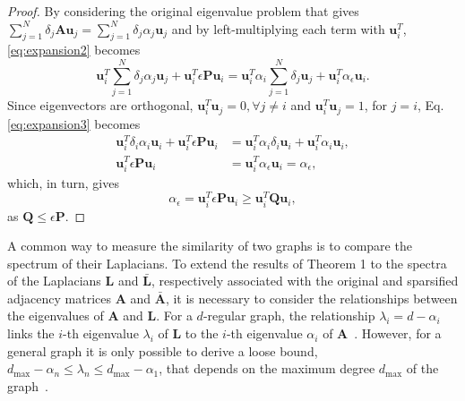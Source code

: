 \documentclass[journal]{IEEEtran}
\def\u{{\mathbf u}}
\def\A{{\mathbf A}}
\def\L{{\mathbf L}}
\begin{document}
\begin{proof}
By considering the original eigenvalue problem that gives $\sum \limits_{j=1}^N \delta_j \A \u_j = \sum \limits_{j=1}^N \delta_j \alpha_j \u_j$ and by left-multiplying each term with $\u_i^T$, \eqref{eq:expansion2} becomes
\begin{equation}
    \label{eq:expansion3}
    \u_i^T \sum \limits_{j=1}^N \delta_j \alpha_j \u_j + \u_i^T \epsilon \mathbf{P}\u_i =   \u_i^T \alpha_i \sum \limits_{j=1}^N \delta_j \u_j + \u_i^T \alpha_{\epsilon}\u_i.
\end{equation}
Since eigenvectors are orthogonal, $\u_i^T \u_j = 0, \forall j \neq i$ and $\u_i^T \u_j = 1$, for $j = i$, Eq. \eqref{eq:expansion3} becomes
\begin{equation}
    \begin{aligned}
    \u_i^T \delta_i \alpha_i \u_i + \u_i^T \epsilon \mathbf{P}\u_i & = \u_i^T \alpha_i \delta_i \u_i + \u_i^T \alpha_i\u_i, \\
    \u_i^T \epsilon \mathbf{P}\u_i & =  \u_i^T \alpha_{\epsilon}\u_i = \alpha_{\epsilon},
    \end{aligned}
\end{equation}
which, in turn, gives 
\begin{equation}
    \alpha_{\epsilon} = \u_i^T \epsilon \mathbf{P} \u_i \geq \u_i^T \mathbf{Q} \u_i,
\end{equation}
as $\mathbf{Q} \leq \epsilon \mathbf{P}$.
\end{proof}

A common way to measure the similarity of two graphs is to compare the spectrum of their Laplacians.
To extend the results of Theorem 1 to the spectra of the Laplacians $\L$ and $\bar \L$, respectively associated with the original and sparsified adjacency matrices $\A$ and $\bar \A$, it is necessary to consider the relationships between the eigenvalues of $\A$ and $\L$.
For a $d$-regular graph, the relationship $\lambda_i = d - \alpha_i$ links the $i$-th eigenvalue $\lambda_i$ of $\L$ to the $i$-th eigenvalue $\alpha_i$ of $\A$~\cite{lutzeyer2017comparing}.
However, for a general graph it is only possible to derive a loose bound, $d_\text{max} - \alpha_n \leq \lambda_n \leq d_\text{max} - \alpha_1$, that depends on the maximum degree $d_\text{max}$ of the graph~\cite[Lemma 2.21]{zumstein2005comparison}.
\end{document}
